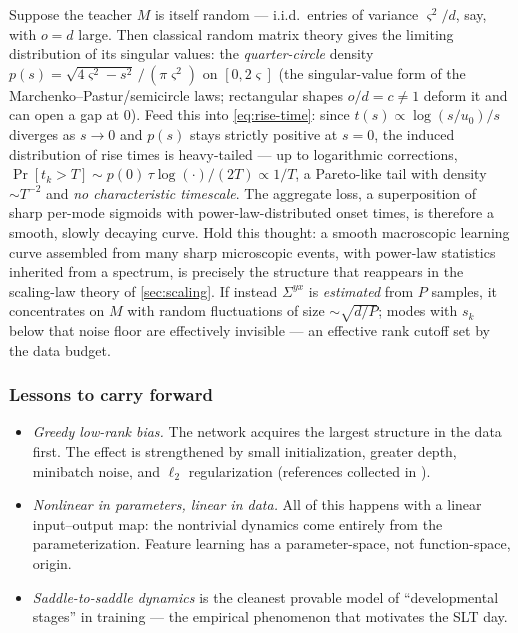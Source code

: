 \documentclass[11pt]{article}
\begin{document}
\begin{remark}
\label{rem:random-teacher}
Suppose the teacher $M$ is itself random --- i.i.d.\ entries of variance
$\varsigma^2/d$, say, with $o = d$ large. Then classical random matrix
theory gives the limiting distribution of its singular values: the
\emph{quarter-circle} density $p(s) = \sqrt{4\varsigma^2 - s^2}\,/\,
(\pi\varsigma^2)$ on $[0, 2\varsigma]$ (the singular-value form of the
Marchenko--Pastur/semicircle laws; rectangular shapes $o/d = c \neq 1$
deform it and can open a gap at $0$). Feed this into
\cref{eq:rise-time}: since $t(s) \propto \log(s/u_0)/s$ diverges as
$s \to 0$ and $p(s)$ stays strictly positive at $s = 0$, the induced
distribution of rise times is heavy-tailed --- up to logarithmic
corrections, $\Pr[t_k > T] \sim p(0)\,\tau\log(\cdot)/(2T) \propto 1/T$,
a Pareto-like tail with density $\sim T^{-2}$ and \emph{no characteristic
timescale}. The aggregate loss, a superposition of sharp per-mode sigmoids
with power-law-distributed onset times, is therefore a smooth, slowly
decaying curve. Hold this thought: a smooth macroscopic learning curve
assembled from many sharp microscopic events, with power-law statistics
inherited from a spectrum, is precisely the structure that reappears in
the scaling-law theory of \cref{sec:scaling}. If instead $\Sigma^{yx}$ is
\emph{estimated} from $P$ samples, it concentrates on $M$ with random
fluctuations of size $\sim\sqrt{d/P}$; modes with $s_k$ below that noise
floor are effectively invisible --- an effective rank cutoff set by the
data budget.
\end{remark}

\subsubsection{Lessons to carry forward}

\begin{itemize}
  \item \emph{Greedy low-rank bias.} The network acquires the largest
  structure in the data first. The effect is strengthened by small
  initialization, greater depth, minibatch noise, and $\ell_2$
  regularization (references collected in \cite{simon2026scientific}).
  \item \emph{Nonlinear in parameters, linear in data.} All of this
  happens with a linear input--output map: the nontrivial dynamics come
  entirely from the parameterization. Feature learning has a
  parameter-space, not function-space, origin.
  \item \emph{Saddle-to-saddle dynamics} is the cleanest provable model of
  ``developmental stages'' in training --- the empirical phenomenon that
  motivates the SLT day.
\end{itemize}
\end{document}
